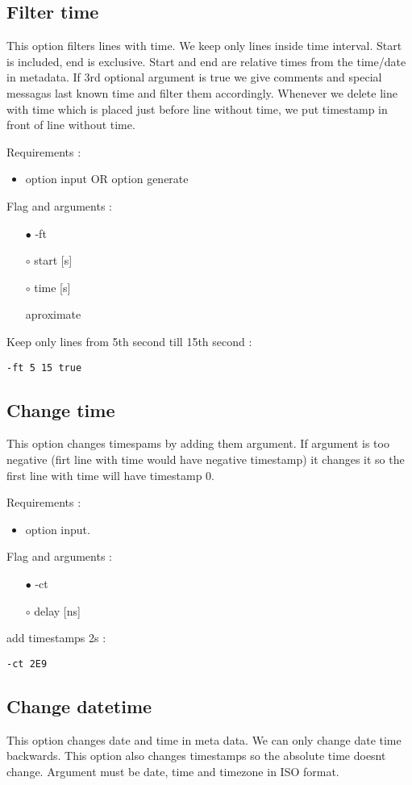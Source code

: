 \documentclass[english]{article}
\begin{document}
\subsection{Filter time}
This option filters lines with time. We keep only lines inside time interval. Start is included, end is exclusive. Start and end are relative times from the time/date in metadata. If 3rd optional argument is true we give comments and special messagas last known time and filter them accordingly.  Whenever we delete line with time which is placed just before line without time, we put timestamp in front of line without time.

\noindent Requirements : 
\begin{itemize}
\item option input OR option generate
\end{itemize}
Flag and arguments :
\begin{itemize}
\item[$\bullet$] -ft
\item[$\circ$] start [s]
\item[$\circ$] time [s]
\item[\textasteriskcentered] aproximate
\end{itemize}
Keep only lines from 5th second till 15th second : 
\begin{lstlisting} 
-ft 5 15 true
\end{lstlisting}


\subsection{Change time}
This option changes timespams by adding them argument. If argument is too negative (firt line with time would have negative timestamp) it changes it so the first line with time will have timestamp 0. 

\noindent Requirements : 
\begin{itemize}
\item option input. 
\end{itemize}
Flag and arguments :
\begin{itemize}
\item[$\bullet$] -ct
\item[$\circ$] delay [ns]
\end{itemize}
add timestamps 2s : 
\begin{lstlisting} 
-ct 2E9
\end{lstlisting}


\subsection{Change datetime}
This option changes date and time in meta data. We can only change date time backwards. This option also changes timestamps so the absolute time doesnt change. Argument must be date, time and timezone in ISO format. 
\end{document}
